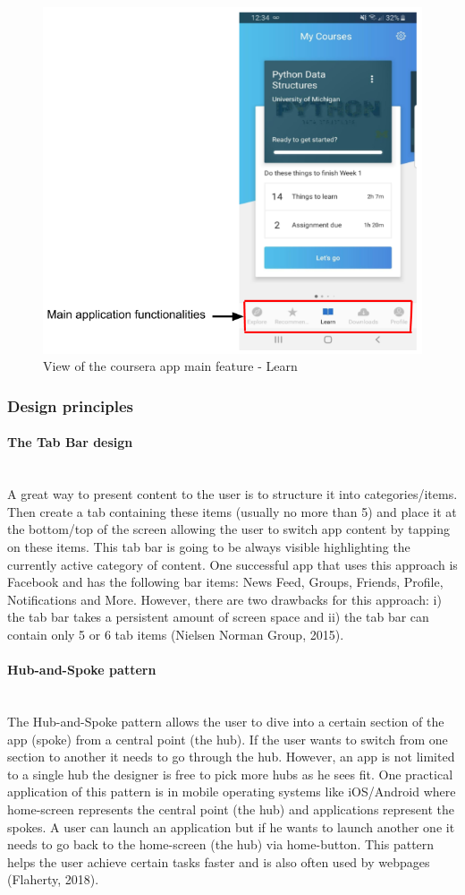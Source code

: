 \documentclass[version=last,fontsize=13pt]{scrartcl}
\newcommand{\myparagraph}[1]{\paragraph{#1}\mbox{}\\}
\begin{document}
			\begin{figure}[H]

				\includegraphics[scale = 0.5]{./imgs/CourseraApp}
				\caption{View of the coursera app main feature - Learn}
				\label{courseraApp}
		
			\end{figure}

		\subsubsection{Design principles}
		\myparagraph{The Tab Bar design}
		\indent
		A great way to present content to the user is to structure it into categories/items. Then create a tab containing these items (usually no more than 5) and place it at the bottom/top of the screen allowing the user to switch app content by tapping on these items. This tab bar is going to be always visible highlighting the currently active category of content. One successful app that uses this approach is Facebook and has the following bar items: News Feed, Groups, Friends, Profile, Notifications and More.  However, there are two drawbacks for this approach: i) the tab bar takes a persistent amount of screen space and ii) the tab bar can contain only  5 or 6 tab items (Nielsen Norman Group, 2015).


		\myparagraph{Hub-and-Spoke pattern}
		\indent
		The Hub-and-Spoke pattern allows the user to dive into a certain section of the app (spoke) from a central point (the hub). If the user wants to switch from one section to another it needs to go through the hub. However, an app is not limited to a single hub the designer is free to pick more hubs as he sees fit. One practical application of this pattern is in mobile operating systems like iOS/Android where home-screen represents the central point (the hub) and  applications represent the spokes. A user can launch an application but if he wants to launch another one it needs to go back to the home-screen (the hub) via home-button. This pattern helps the user achieve certain tasks faster and is also often used by webpages (Flaherty, 2018).
\end{document}
